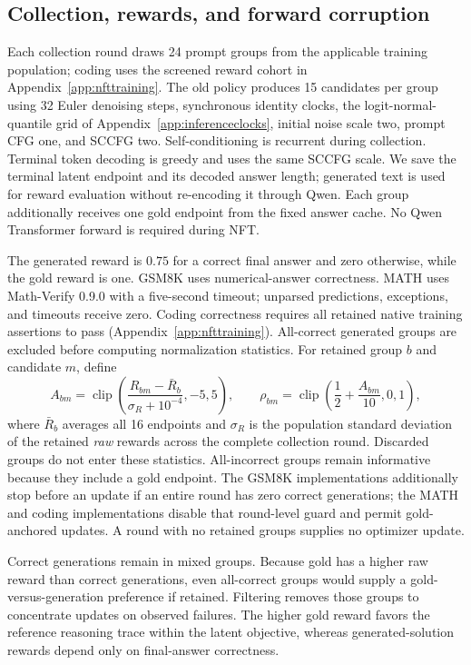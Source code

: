 \documentclass[11pt,letterpaper]{article}
\begin{document}
\subsection{Collection, rewards, and forward corruption}

Each collection round draws 24 prompt groups from the applicable training population; coding uses the screened reward cohort in Appendix~\ref{app:nfttraining}. The old policy produces 15 candidates per group using 32 Euler denoising steps, synchronous identity clocks, the logit-normal-quantile grid of Appendix~\ref{app:inferenceclocks}, initial noise scale two, prompt CFG one, and SCCFG two. Self-conditioning is recurrent during collection. Terminal token decoding is greedy and uses the same SCCFG scale. We save the terminal latent endpoint and its decoded answer length; generated text is used for reward evaluation without re-encoding it through Qwen. Each group additionally receives one gold endpoint from the fixed answer cache. No Qwen Transformer forward is required during NFT.

The generated reward is $0.75$ for a correct final answer and zero otherwise, while the gold reward is one. GSM8K uses numerical-answer correctness. MATH uses Math-Verify 0.9.0 with a five-second timeout; unparsed predictions, exceptions, and timeouts receive zero. Coding correctness requires all retained native training assertions to pass (Appendix~\ref{app:nfttraining}). All-correct generated groups are excluded before computing normalization statistics. For retained group $b$ and candidate $m$, define
\begin{equation}
 A_{bm}=\operatorname{clip}\!\left(
 \frac{R_{bm}-\bar R_b}{\sigma_R+10^{-4}},-5,5\right),
 \qquad
 \rho_{bm}=\operatorname{clip}\!\left(\frac12+\frac{A_{bm}}{10},0,1\right),
 \label{eq:nftrewardnormalization}
\end{equation}
where $\bar R_b$ averages all 16 endpoints and $\sigma_R$ is the population standard deviation of the retained \emph{raw} rewards across the complete collection round. Discarded groups do not enter these statistics. All-incorrect groups remain informative because they include a gold endpoint. The GSM8K implementations additionally stop before an update if an entire round has zero correct generations; the MATH and coding implementations disable that round-level guard and permit gold-anchored updates. A round with no retained groups supplies no optimizer update.

Correct generations remain in mixed groups. Because gold has a higher raw reward than correct generations, even all-correct groups would supply a gold-versus-generation preference if retained. Filtering removes those groups to concentrate updates on observed failures. The higher gold reward favors the reference reasoning trace within the latent objective, whereas generated-solution rewards depend only on final-answer correctness.
\end{document}

